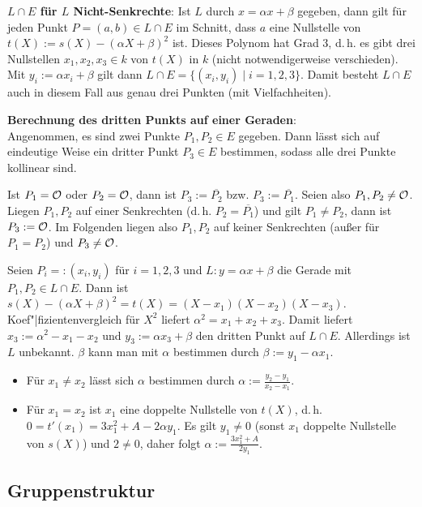 \textbf{$L \cap E$ für $L$ Nicht-Senkrechte}:
Ist $L$ durch $x = \alpha x + \beta$ gegeben, dann gilt für jeden Punkt $P = (a, b) \in L \cap E$
im Schnitt, dass $a$ eine Nullstelle von $t(X) := s(X) - (\alpha X + \beta)^2$ ist.
Dieses Polynom hat Grad 3, d.\,h. es gibt drei Nullstellen $x_1, x_2, x_3 \in k$ von $t(X)$ in $k$
(nicht notwendigerweise verschieden).
Mit $y_i := \alpha x_i + \beta$ gilt dann $L \cap E = \{(x_i, y_i) \;|\; i = 1, 2, 3\}$.
Damit besteht $L \cap E$ auch in diesem Fall aus genau drei Punkten (mit Vielfachheiten).

\linie

\textbf{Berechnung des dritten Punkts auf einer Geraden}:\\
Angenommen, es sind zwei Punkte $P_1, P_2 \in E$ gegeben.
Dann lässt sich auf eindeutige Weise ein dritter Punkt $P_3 \in E$ bestimmen,
sodass alle drei Punkte kollinear sind.

Ist $P_1 = \mathcal{O}$ oder $P_2 = \mathcal{O}$, dann ist $P_3 := \overline{P_2}$ bzw. $P_3 := \overline{P_1}$.
Seien also $P_1, P_2 \not= \mathcal{O}$.
Liegen $P_1, P_2$ auf einer Senkrechten (d.\,h. $P_2 = \overline{P_1}$)
und gilt $P_1 \not= P_2$, dann ist $P_3 := \mathcal{O}$.
Im Folgenden liegen also $P_1, P_2$ auf keiner Senkrechten
(außer für $P_1 = P_2$) und $P_3 \not= \mathcal{O}$.

Seien $P_i =: (x_i, y_i)$ für $i = 1, 2, 3$ und $L\colon y = \alpha x + \beta$ die Gerade
mit $P_1, P_2 \in L \cap E$.
Dann ist $s(X) - (\alpha X + \beta)^2 = t(X) = (X - x_1) (X - x_2) (X - x_3)$.
Koef"|fizientenvergleich für $X^2$ liefert $\alpha^2 = x_1 + x_2 + x_3$.
Damit liefert $x_3 := \alpha^2 - x_1 - x_2$ und $y_3 := \alpha x_3 + \beta$ den dritten Punkt auf
$L \cap E$.
Allerdings ist $L$ unbekannt.
$\beta$ kann man mit $\alpha$ bestimmen durch $\beta := y_1 - \alpha x_1$.
\begin{itemize}
    \item
    Für $x_1 \not= x_2$ lässt sich $\alpha$ bestimmen durch
    $\alpha := \frac{y_2 - y_1}{x_2 - x_1}$.

    \item
    Für $x_1 = x_2$ ist $x_1$ eine doppelte Nullstelle von $t(X)$,
    d.\,h. $0 = t'(x_1) = 3x_1^2 + A - 2\alpha y_1$.
    Es gilt $y_1 \not= 0$ (sonst $x_1$ doppelte Nullstelle von $s(X)$) und $2 \not= 0$,
    daher folgt $\alpha := \frac{3x_1^2 + A}{2y_1}$.
\end{itemize}

\pagebreak

\subsection{%
    Gruppenstruktur%
}

